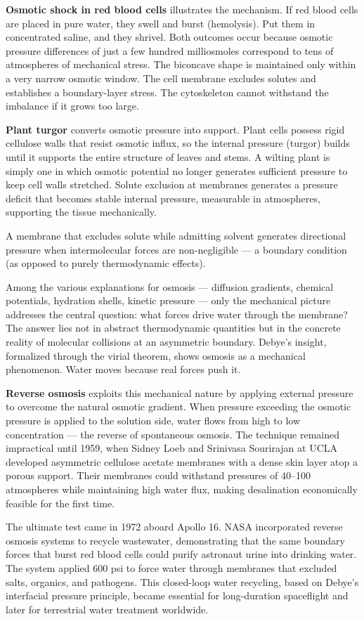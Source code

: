 \textbf{Osmotic shock in red blood cells} illustrates the mechanism. If red blood cells are placed in pure water, they swell and burst (hemolysis). Put them in concentrated saline, and they shrivel. Both outcomes occur because osmotic pressure differences of just a few hundred milliosmoles correspond to tens of atmospheres of mechanical stress. The biconcave shape is maintained only within a very narrow osmotic window. The cell membrane excludes solutes and establishes a boundary-layer stress. The cytoskeleton cannot withstand the imbalance if it grows too large.

\textbf{Plant turgor} converts osmotic pressure into support. Plant cells possess rigid cellulose walls that resist osmotic influx, so the internal pressure (turgor) builds until it supports the entire structure of leaves and stems. A wilting plant is simply one in which osmotic potential no longer generates sufficient pressure to keep cell walls stretched. Solute exclusion at membranes generates a pressure deficit that becomes stable internal pressure, measurable in atmospheres, supporting the tissue mechanically.

A membrane that excludes solute while admitting solvent generates directional pressure when intermolecular forces are non-negligible — a boundary condition (as opposed to purely thermodynamic effects).

Among the various explanations for osmosis — diffusion gradients, chemical potentials, hydration shells, kinetic pressure — only the mechanical picture addresses the central question: what forces drive water through the membrane? The answer lies not in abstract thermodynamic quantities but in the concrete reality of molecular collisions at an asymmetric boundary. Debye's insight, formalized through the virial theorem, shows osmosis as a mechanical phenomenon. Water moves because real forces push it.

\textbf{Reverse osmosis} exploits this mechanical nature by applying external pressure to overcome the natural osmotic gradient. When pressure exceeding the osmotic pressure is applied to the solution side, water flows from high to low concentration — the reverse of spontaneous osmosis. The technique remained impractical until 1959, when Sidney Loeb and Srinivasa Sourirajan at UCLA developed asymmetric cellulose acetate membranes with a dense skin layer atop a porous support. Their membranes could withstand pressures of 40–100 atmospheres while maintaining high water flux, making desalination economically feasible for the first time.

The ultimate test came in 1972 aboard Apollo 16. NASA incorporated reverse osmosis systems to recycle wastewater, demonstrating that the same boundary forces that burst red blood cells could purify astronaut urine into drinking water. The system applied 600 psi to force water through membranes that excluded salts, organics, and pathogens. This closed-loop water recycling, based on Debye's interfacial pressure principle, became essential for long-duration spaceflight and later for terrestrial water treatment worldwide.
